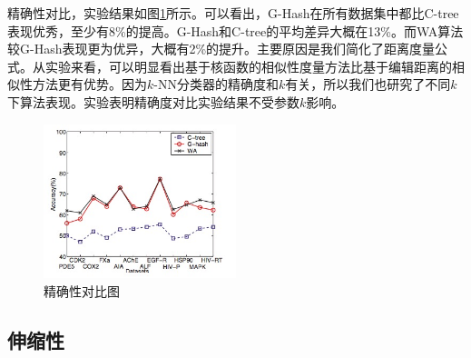 \documentclass{article}
\begin{document}
精确性对比，实验结果如图\ref{fg:ac}所示。可以看出，G-Hash在所有数据集中都比C-tree表现优秀，至少有8\%的提高。G-Hash和C-tree的平均差异大概在13\%。而WA算法较G-Hash表现更为优异，大概有2\%的提升。主要原因是我们简化了距离度量公式。从实验来看，可以明显看出基于核函数的相似性度量方法比基于编辑距离的相似性方法更有优势。因为$k$-NN分类器的精确度和$k$有关，所以我们也研究了不同$k$下算法表现。实验表明精确度对比实验结果不受参数$k$影响。
\begin{figure}[htb]
    \centering
    \includegraphics[width=0.5\textwidth]{ac}
    \caption{精确性对比图}
    \label{fg:ac}
\end{figure}
\subsection{伸缩性}
\end{document}
